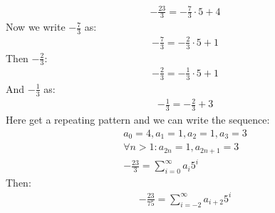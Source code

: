 \begin{enumerate}[label=\ilabel]
\begin{enumerate}[label=\alph*)]
                \begin{gather*}
                    - \frac{23}{3} = - \frac{7}{3} \cdot 5 + 4
                \end{gather*}
                Now we write $- \frac{7}{3}$ as:
                \begin{gather*}
                    -\frac{7}{3} = -\frac{2}{3} \cdot 5 + 1
                \end{gather*}
                Then $-\frac{2}{3}$:
                \begin{gather*}
                    -\frac{2}{3} = - \frac{1}{3} \cdot 5 + 1
                \end{gather*}
                And $-\frac{1}{3}$ as:
                \begin{gather*}
                    - \frac{1}{3} = - \frac{2}{3} + 3
                \end{gather*}
                Here get a repeating pattern and we can write the sequence:
                \begin{gather*}
                    a_0 = 4, a_1 = 1, a_2 = 1, a_3 = 3 \\
                    \forall n > 1: a_{2n} = 1, a_{2n + 1} = 3 \\
                    - \frac{23}{3} = \sum_{i = 0}^\infty a_i 5^i
                \end{gather*}
                Then:
                \begin{gather*}
                    -\frac{23}{75} = \sum_{i = -2}^\infty a_{i + 2} 5^i
                \end{gather*}
        \end{enumerate}
\end{enumerate}